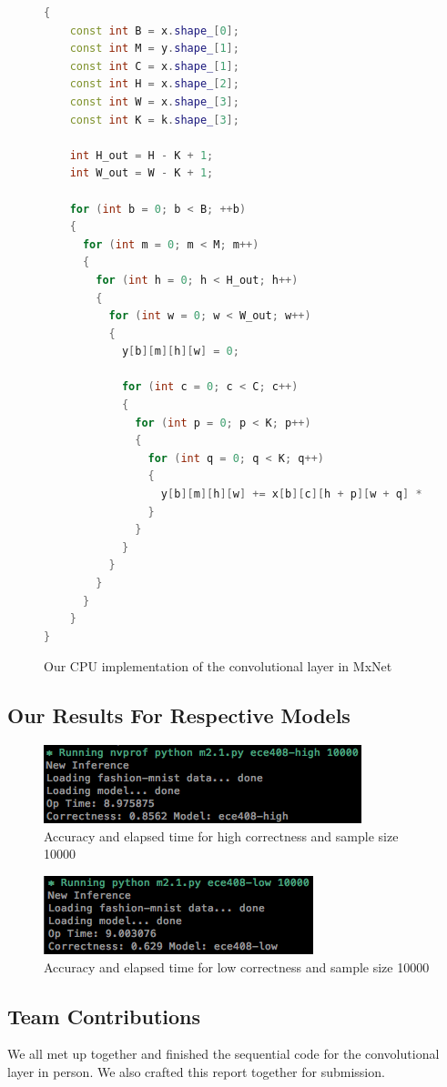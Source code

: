 \documentclass[titlepage]{article}
\begin{document}
\begin{figure}[h!]
\begin{lstlisting}[language=C++]
{
    const int B = x.shape_[0];
    const int M = y.shape_[1];
    const int C = x.shape_[1];
    const int H = x.shape_[2];
    const int W = x.shape_[3];
    const int K = k.shape_[3];

    int H_out = H - K + 1;
    int W_out = W - K + 1;

    for (int b = 0; b < B; ++b)
    {
      for (int m = 0; m < M; m++)
      {
        for (int h = 0; h < H_out; h++)
        {
          for (int w = 0; w < W_out; w++)
          {
            y[b][m][h][w] = 0;

            for (int c = 0; c < C; c++)
            {
              for (int p = 0; p < K; p++)
              {
                for (int q = 0; q < K; q++)
                {
                  y[b][m][h][w] += x[b][c][h + p][w + q] * k[m][c][p][q];
                }
              }
            }
          }
        }
      }
    }
}
\end{lstlisting}
\caption{Our CPU implementation of the convolutional layer in MxNet}
\end{figure}

\newpage

\subsection*{Our Results For Respective Models}

\begin{figure}[h!]
\includegraphics[width=\linewidth]{ece-408-high-10000.png}
\caption{Accuracy and elapsed time for high correctness and sample size 10000}
\label{fig:flowFree}
\end{figure}

\begin{figure}[h!]
\includegraphics[width=\linewidth]{ece-408-low-10000.png}
\caption{Accuracy and elapsed time for low correctness and sample size 10000}
\label{fig:flowFree}
\end{figure}

\subsection*{Team Contributions}
We all met up together and finished the sequential code for the convolutional layer in person. We also crafted this report together for submission.
\end{document}
